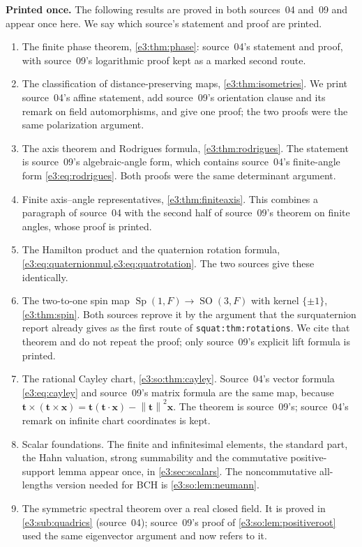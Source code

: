 \documentclass[11pt,letterpaper]{article}
\numberwithin{equation}{section}
\theoremstyle{definition}
\theoremstyle{remark}
\newcommand{\SO}{\operatorname{SO}}
\newcommand{\Sp}{\operatorname{Sp}}
\newcommand{\norm}[1]{\left\lVert#1\right\rVert}
\newcommand{\vv}[1]{\bm{#1}}
\begin{document}
\textbf{Printed once.} The following results are proved in both sources~04
and~09 and
appear once here. We say which source's statement and proof are printed.
\begin{enumerate}[label=(\alph*)]
\item The finite phase theorem, \cref{e3:thm:phase}: source~04's statement
 and proof, with source~09's logarithmic proof kept as a marked second route.
\item The classification of distance-preserving maps,
 \cref{e3:thm:isometries}. We print source~04's affine statement, add
 source~09's orientation clause and its remark on field automorphisms, and
 give one proof; the two proofs were the same polarization argument.
\item The axis theorem and Rodrigues formula, \cref{e3:thm:rodrigues}. The
 statement is source~09's algebraic-angle form, which contains source~04's
 finite-angle form \cref{e3:eq:rodrigues}. Both proofs were the same
 determinant argument.
\item Finite axis--angle representatives, \cref{e3:thm:finiteaxis}. This
 combines a paragraph of source~04 with the second half of source~09's
 theorem on finite angles, whose proof is printed.
\item The Hamilton product and the quaternion rotation formula,
 \cref{e3:eq:quaternionmul,e3:eq:quatrotation}. The two sources give these
 identically.
\item The two-to-one spin map $\Sp(1,F)\to\SO(3,F)$ with kernel $\{\pm1\}$,
 \cref{e3:thm:spin}. Both sources reprove it by the argument that the
 surquaternion report already gives as the first route of
 \texttt{squat:thm:rotations}. We cite that theorem and do not repeat the
 proof; only source~09's explicit lift formula is printed.
\item The rational Cayley chart, \cref{e3:so:thm:cayley}. Source~04's vector
 formula \cref{e3:eq:cayley} and source~09's matrix formula are the same map,
 because $\vv t\times(\vv t\times\vv x)=\vv t(\vv t\cdot\vv x)-\norm{\vv t}^2\vv x$.
 The theorem is source~09's; source~04's remark on infinite chart
 coordinates is kept.
\item Scalar foundations. The finite and infinitesimal elements, the standard
 part, the Hahn valuation, strong summability and the commutative
 positive-support lemma appear once, in \cref{e3:sec:scalars}. The
 noncommutative all-lengths version needed for BCH is
 \cref{e3:so:lem:neumann}.
\item The symmetric spectral theorem over a real closed field. It is proved in
 \cref{e3:sub:quadrics} (source~04); source~09's proof of
 \cref{e3:so:lem:positiveroot} used the same eigenvector argument and now
 refers to it.
\end{enumerate}
\end{document}
